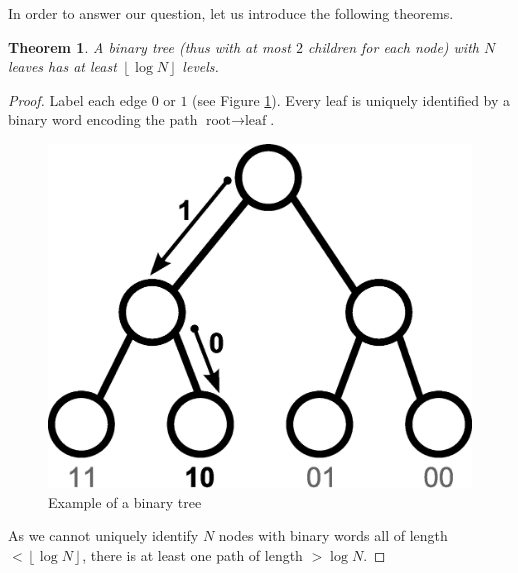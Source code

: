 \documentclass[11pt,a4paper]{article}
\newtheorem{theorem}{Theorem}
\begin{document}
In order to answer our question, let us introduce the following theorems.

\begin{theorem}
A binary tree (thus with at most $2$ children for each node) with $N$ leaves has at least $\left\lfloor \log N \right\rfloor$ levels.
\end{theorem}
\begin{proof}
Label each edge $0$ or $1$ (see Figure \ref{tree6}). Every leaf is uniquely identified by a binary word encoding the path $\text{root} \rightarrow \text{leaf}$.\\
\begin{figure}[htbp]
\centering
\includegraphics[scale=0.5]{inkscape/tree6.eps}
\caption{Example of a binary tree}
\label{tree6}
\end{figure}
As we cannot uniquely identify $N$ nodes with binary words all of length $< \left\lfloor \log N \right\rfloor$, there is at least one path of length $> \log N$.
\end{proof}
\end{document}

